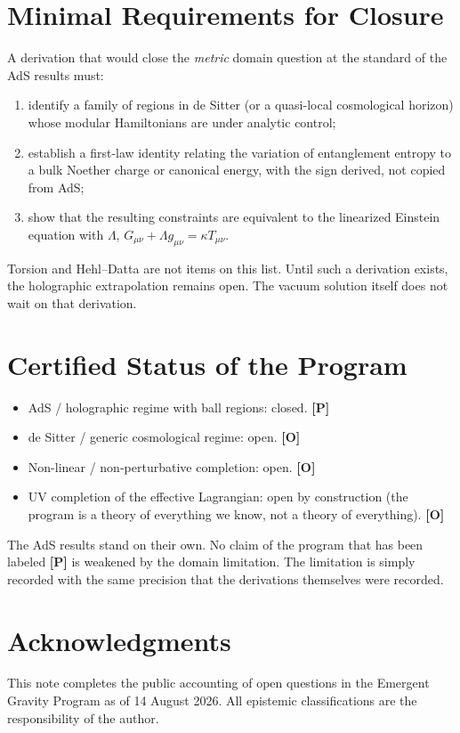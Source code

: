 \documentclass[11pt]{article}
\newcommand{\pP}{\textbf{[P]}}
\newcommand{\pO}{\textbf{[O]}}
\begin{document}
\section{Minimal Requirements for Closure}
A derivation that would close the \emph{metric} domain question at the
standard of the AdS results must:
\begin{enumerate}[leftmargin=1.6em]
\item identify a family of regions in de Sitter (or a quasi-local
cosmological horizon) whose modular Hamiltonians are under analytic
control;
\item establish a first-law identity relating the variation of
entanglement entropy to a bulk Noether charge or canonical energy,
with the sign derived, not copied from AdS;
\item show that the resulting constraints are equivalent to the
linearized Einstein equation with $\Lambda$,
$G_{\mu\nu}+\Lambda g_{\mu\nu}=\kappa T_{\mu\nu}$.
\end{enumerate}
Torsion and Hehl--Datta are not items on this list. Until such a
derivation exists, the holographic extrapolation remains open. The
vacuum solution itself does not wait on that derivation.

\section{Certified Status of the Program}
\begin{itemize}[leftmargin=1.4em]
\item AdS / holographic regime with ball regions: closed. \pP{}
\item de Sitter / generic cosmological regime: open. \pO{}
\item Non-linear / non-perturbative completion: open. \pO{}
\item UV completion of the effective Lagrangian: open by construction
(the program is a theory of everything we know, not a theory of
everything). \pO{}
\end{itemize}
The AdS results stand on their own. No claim of the program that has
been labeled \pP{} is weakened by the domain limitation. The limitation
is simply recorded with the same precision that the derivations
themselves were recorded.

\section*{Acknowledgments}
This note completes the public accounting of open questions in the
Emergent Gravity Program as of 14 August 2026. All epistemic
classifications are the responsibility of the author.
\end{document}

